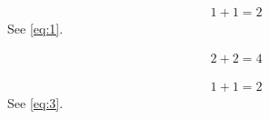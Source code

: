 \documentclass{article}
\begin{document}
\begin{align}\label{eq:1}
	1+1=2
\end{align}
See \eqref{eq:1}.

\begin{align}\label{eq:2}
	2+2=4
\end{align}

\begin{align}\label{eq:3}
	1+1=2
\end{align}
See \eqref{eq:3}.
\end{document}
